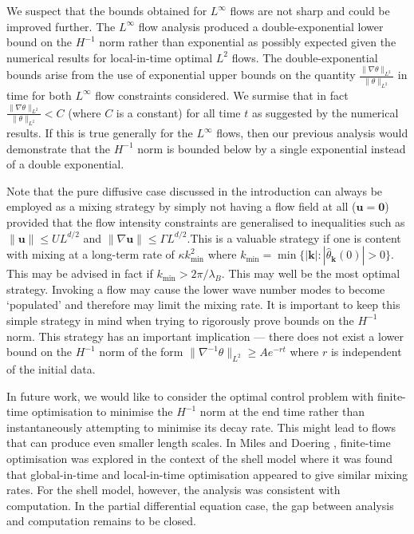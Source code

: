 \documentclass[12pt]{iopart}
\newcommand{\hmone}[1]{\|\nabla^{-1} #1\|_{L^{2}}}
\newcommand{\ltwo}[1]{\|#1\|_{L^{2}}}
\newcommand{\hone}[1]{\| \nabla #1\|_{L^{2}}}
\renewcommand{\vec}[1]{\mathbf{#1}}
\begin{document}
We suspect that the bounds obtained for $L^{\infty}$ flows are not sharp and could be improved further. The $L^{\infty}$ flow analysis produced a double-exponential lower bound on the $H^{-1}$ norm rather than exponential as possibly expected given the numerical results for local-in-time optimal $L^2$ flows. The double-exponential bounds arise from the use of exponential upper bounds on the quantity $\frac{\hone{\theta}}{\ltwo{\theta}}$ in time for both $L^{\infty}$ flow constraints considered. We surmise that in fact $\frac{\hone{\theta}}{\ltwo{\theta}} < C$ (where $C$ is a constant) for all time $t$ as suggested by the numerical results. If this is true generally for the $L^{\infty}$  flows, then our previous analysis would demonstrate that the $H^{-1}$ norm is bounded below by a single exponential instead of a double exponential.

Note that the pure diffusive case discussed in the introduction can always be employed as a mixing strategy by simply not having a flow field at all ($\vec{u} =\vec{0}$) provided that the flow intensity constraints are generalised to inequalities such as $\|\vec{u}\| \leq UL^{d/2}$ and $\|\nabla \vec{u}\| \leq \Gamma L^{d/2}$.This is a valuable strategy if one is content with mixing at a long-term rate of $\kappa k_{\min}^2$ where $k_{\min} = \min \{ |\vec{k}|  :  |\hat{\theta}_{\vec{k}}(0)| > 0  \}$. This may be advised in fact if $k_{\min} > 2 \pi / \lambda_{B}$. This may well be the most optimal strategy. Invoking a flow may cause the lower wave number modes to become `populated' and therefore may limit the mixing rate. It is important to keep this simple strategy in mind when trying to rigorously prove bounds on the $H^{-1}$ norm. This strategy has an important implication --- there does not exist a lower bound on the  $H^{-1}$ norm of the form $\hmone{\theta} \geq A e^{-rt}$ where  $r$ is independent of the initial data.

In future work, we would like to consider the optimal control problem with finite-time optimisation to minimise the $H^{-1}$ norm at the end time rather than instantaneously attempting to minimise its decay rate. This might lead to flows that can produce even smaller length scales. In Miles and Doering \cite{Miles2017a}, finite-time optimisation was explored in the context of the shell model where it was found that global-in-time and local-in-time optimisation appeared to give similar mixing rates. For the shell model, however, the analysis was consistent with computation. In the partial differential equation case, the gap between analysis and computation remains to be closed.
\end{document}
